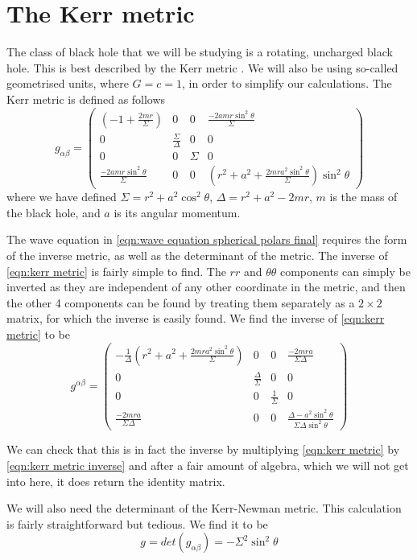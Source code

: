 \documentclass[11pt]{article}
\numberwithin{equation}{section}
\numberwithin{figure}{section}
\numberwithin{table}{section}
\begin{document}
\section{The Kerr metric}\label{sec:Kerr}
\par The class of black hole that we will be studying is a rotating, uncharged black hole. This is best described by the Kerr metric \cite{kerr}. We will also be using so-called geometrised units, where $G=c=1$, in order to simplify our calculations. The Kerr metric is defined as follows
\begin{equation}
    g_{\alpha\beta}=
    \begin{pmatrix}
        (-1+\frac{2mr}{\Sigma}) & 0 & 0 & \frac{-2amr\sin^2\theta}{\Sigma} \\
        0 & \frac{\Sigma}{\Delta} & 0 & 0 \\
        0 & 0 & \Sigma & 0 \\
        \frac{-2amr\sin^2\theta}{\Sigma} & 0 & 0 & \left(r^2+a^2+\frac{2mra^2\sin^2\theta}{\Sigma}\right)\sin^2\theta
    \end{pmatrix}
    \label{eqn:kerr metric}
\end{equation}
where we have defined $\Sigma=r^2+a^2\cos^2\theta$, $\Delta=r^2+a^2-2mr$, $m$ is the mass of the black hole, and $a$ is its angular momentum. 
\par The wave equation in \cref{eqn:wave equation spherical polars final} requires the form of the inverse metric, as well as the determinant of the metric. The inverse of \cref{eqn:kerr metric} is fairly simple to find. The $rr$ and $\theta\theta$ components can simply be inverted as they are independent of any other coordinate in the metric, and then the other 4 components can be found by treating them separately as a $2\times2$ matrix, for which the inverse is easily found. We find the inverse of \cref{eqn:kerr metric} to be
\begin{equation}
    g^{\alpha\beta}=
    \begin{pmatrix}
        -\frac{1}{\Delta}\left(r^2+a^2+\frac{2mra^2\sin^2\theta}{\Sigma}\right) & 0 & 0 & \frac{-2mra}{\Sigma\Delta} \\
        0 & \frac{\Delta}{\Sigma} & 0 & 0 \\
        0 & 0 & \frac{1}{\Sigma} & 0 \\
        \frac{-2mra}{\Sigma\Delta} & 0 & 0 & \frac{\Delta-a^2\sin^2\theta}{\Sigma\Delta\sin^2\theta}
    \end{pmatrix}
    \label{eqn:kerr metric inverse}
\end{equation}
\par We can check that this is in fact the inverse by multiplying \cref{eqn:kerr metric} by \cref{eqn:kerr metric inverse} and after a fair amount of algebra, which we will not get into here, it does return the identity matrix. 
\par We will also need the determinant of the Kerr-Newman metric. This calculation is fairly straightforward but tedious. We find it to be
\begin{equation}
    g=det(g_{\alpha\beta})=-\Sigma^2\sin^2\theta
\end{equation}
\end{document}
